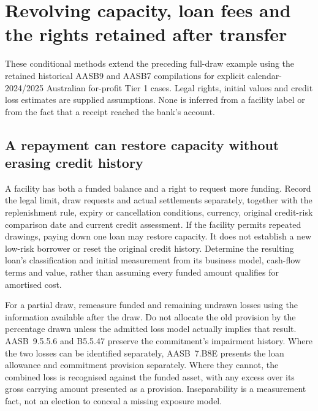 \hypertarget{revolving-capacity-loan-fees-and-the-rights-retained-after-transfer}{%
\section{Revolving capacity, loan fees and the rights retained after transfer}\label{revolving-capacity-loan-fees-and-the-rights-retained-after-transfer}}

These conditional methods extend the preceding full-draw example using the retained historical AASB9 and AASB7 compilations for explicit calendar-2024/2025 Australian for-profit Tier 1 cases. Legal rights, initial values and credit loss estimates are supplied assumptions. None is inferred from a facility label or from the fact that a receipt reached the bank's account.

\hypertarget{a-repayment-can-restore-capacity-without-erasing-credit-history}{%
\subsection{A repayment can restore capacity without erasing credit history}\label{a-repayment-can-restore-capacity-without-erasing-credit-history}}

A facility has both a funded balance and a right to request more funding. Record the legal limit, draw requests and actual settlements separately, together with the replenishment rule, expiry or cancellation conditions, currency, original credit-risk comparison date and current credit assessment. If the facility permits repeated drawings, paying down one loan may restore capacity. It does not establish a new low-risk borrower or reset the original credit history. Determine the resulting loan's classification and initial measurement from its business model, cash-flow terms and value, rather than assuming every funded amount qualifies for amortised cost.

For a partial draw, remeasure funded and remaining undrawn losses using the information available after the draw. Do not allocate the old provision by the percentage drawn unless the admitted loss model actually implies that result. AASB~9.5.5.6 and B5.5.47 \citep[5.5.6 and B5.5.47]{aasb9dated} preserve the commitment's impairment history. Where the two losses can be identified separately, AASB~7.B8E \citep[B8E]{aasb7dated} presents the loan allowance and commitment provision separately. Where they cannot, the combined loss is recognised against the funded asset, with any excess over its gross carrying amount presented as a provision. Inseparability is a measurement fact, not an election to conceal a missing exposure model.

